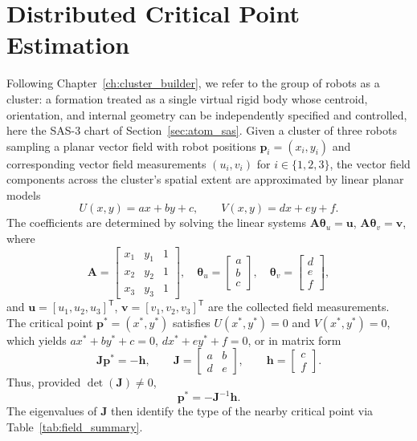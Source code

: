 \documentclass[12pt, letterpaper, oneside]{report}
\begin{document}
\section{Distributed Critical Point Estimation}
\label{sec:vf_estimation}

Following Chapter~\ref{ch:cluster_builder}, we refer to the group of robots
as a cluster: a formation treated as a single virtual rigid body whose
centroid, orientation, and internal geometry can be independently specified
and controlled, here the SAS-3 chart of
Section~\ref{sec:atom_sas}. Given a cluster of three robots sampling a
planar vector field with robot positions $\mathbf{p}_i=(x_i,y_i)$ and
corresponding vector field measurements $(u_i,v_i)$ for $i\in\{1,2,3\}$, the
vector field components across the cluster's spatial extent are approximated
by linear planar models
\begin{equation}
U(x,y)=ax+by+c, \qquad V(x,y)=dx+ey+f.
\end{equation}
The coefficients are determined by solving the linear systems
$\mathbf{A}\boldsymbol{\theta}_u=\mathbf{u}$, $\mathbf{A}\boldsymbol{\theta}_v=\mathbf{v}$,
where
\begin{equation}
\mathbf{A} = \begin{bmatrix} x_1 & y_1 & 1 \\ x_2 & y_2 & 1 \\ x_3 & y_3 & 1 \end{bmatrix},
\quad
\boldsymbol{\theta}_u = \begin{bmatrix} a\\b\\c \end{bmatrix},
\quad
\boldsymbol{\theta}_v = \begin{bmatrix} d\\e\\f \end{bmatrix},
\end{equation}
and $\mathbf{u}=[u_1,u_2,u_3]^{\mathsf T}$, $\mathbf{v}=[v_1,v_2,v_3]^{\mathsf T}$
are the collected field measurements. The critical point
$\mathbf{p}^*=(x^*,y^*)$ satisfies $U(x^*,y^*)=0$ and $V(x^*,y^*)=0$, which
yields $ax^*+by^*+c=0$, $dx^*+ey^*+f=0$, or in matrix form
\begin{equation}
\mathbf{J}\mathbf{p}^* = -\mathbf{h}, \qquad
\mathbf{J} = \begin{bmatrix} a & b \\ d & e \end{bmatrix}, \qquad
\mathbf{h} = \begin{bmatrix} c \\ f \end{bmatrix}.
\label{eq:vf_jacobian_offset}
\end{equation}
Thus, provided $\det(\mathbf{J})\neq0$,
\begin{equation}
\mathbf{p}^* = -\mathbf{J}^{-1}\mathbf{h}.
\label{eq:vf_pstar}
\end{equation}
The eigenvalues of $\mathbf{J}$ then identify the type of the nearby
critical point via Table~\ref{tab:field_summary}.
\end{document}
